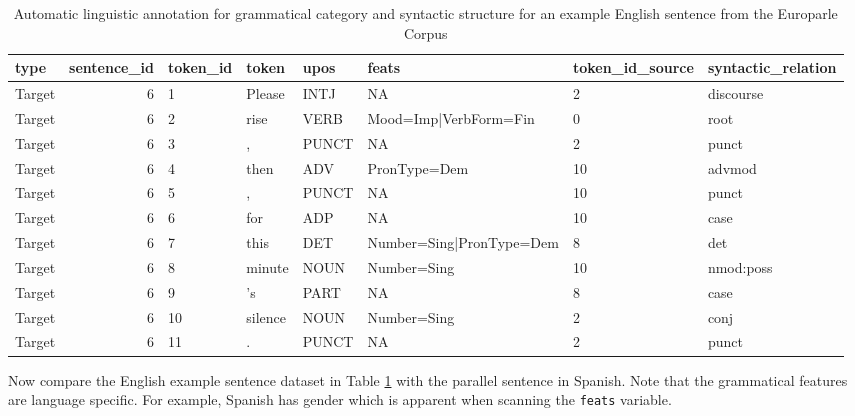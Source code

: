 \documentclass[
]{article}
\begin{document}
\begin{table}

\caption{\label{tab:generation-europarle-en-example}Automatic linguistic annotation for grammatical category and syntactic structure for an example English sentence from the Europarle Corpus}
\centering
\begin{tabular}[t]{lrllllll}
\toprule
type & sentence\_id & token\_id & token & upos & feats & token\_id\_source & syntactic\_relation\\
\midrule
Target & 6 & 1 & Please & INTJ & NA & 2 & discourse\\
Target & 6 & 2 & rise & VERB & Mood=Imp|VerbForm=Fin & 0 & root\\
Target & 6 & 3 & , & PUNCT & NA & 2 & punct\\
Target & 6 & 4 & then & ADV & PronType=Dem & 10 & advmod\\
Target & 6 & 5 & , & PUNCT & NA & 10 & punct\\
\addlinespace
Target & 6 & 6 & for & ADP & NA & 10 & case\\
Target & 6 & 7 & this & DET & Number=Sing|PronType=Dem & 8 & det\\
Target & 6 & 8 & minute & NOUN & Number=Sing & 10 & nmod:poss\\
Target & 6 & 9 & 's & PART & NA & 8 & case\\
Target & 6 & 10 & silence & NOUN & Number=Sing & 2 & conj\\
\addlinespace
Target & 6 & 11 & . & PUNCT & NA & 2 & punct\\
\bottomrule
\end{tabular}
\end{table}

Now compare the English example sentence dataset in Table \ref{tab:generation-europarle-en-example} with the parallel sentence in Spanish. Note that the grammatical features are language specific. For example, Spanish has gender which is apparent when scanning the \texttt{feats} variable.
\end{document}
